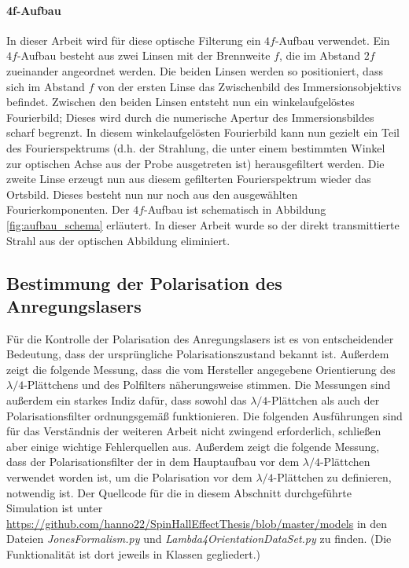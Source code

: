 \documentclass[titlepage,  ngerman]{article}
\begin{document}
	\paragraph{4f-Aufbau}
	In dieser Arbeit wird für diese optische Filterung ein $4f$-Aufbau verwendet. Ein $4f$-Aufbau besteht aus zwei Linsen mit der Brennweite $f$, die im Abstand $2f$ zueinander angeordnet werden. Die beiden Linsen werden so positioniert, dass sich im Abstand $f$ von der ersten Linse das Zwischenbild des Immersionsobjektivs befindet. Zwischen den beiden Linsen entsteht nun ein winkelaufgelöstes Fourierbild; Dieses wird durch die numerische Apertur des Immersionsbildes scharf begrenzt.  In diesem winkelaufgelösten Fourierbild kann nun gezielt ein Teil des Fourierspektrums (d.h. der Strahlung, die unter einem bestimmten Winkel zur optischen Achse aus der Probe ausgetreten ist) herausgefiltert werden. Die zweite Linse erzeugt nun aus diesem gefilterten Fourierspektrum wieder das Ortsbild. Dieses besteht nun nur noch aus den ausgewählten Fourierkomponenten. Der $4f$-Aufbau ist schematisch in Abbildung \ref{fig:aufbau_schema} erläutert. In dieser Arbeit wurde so der direkt transmittierte Strahl aus der optischen Abbildung eliminiert.
	\subsection{Bestimmung der Polarisation des Anregungslasers}
	\label{sec:polarimeter}
	Für die Kontrolle der Polarisation des Anregungslasers ist es von entscheidender Bedeutung, dass der ursprüngliche Polarisationszustand bekannt ist. Außerdem zeigt die folgende Messung, dass die vom Hersteller angegebene Orientierung des $\lambda/4$-Plättchens und des Polfilters näherungsweise stimmen. Die Messungen sind außerdem ein starkes Indiz dafür, dass sowohl das $\lambda/4$-Plättchen als auch der Polarisationsfilter ordnungsgemäß funktionieren. Die folgenden Ausführungen sind für das Verständnis der weiteren Arbeit nicht zwingend erforderlich, schließen aber einige wichtige Fehlerquellen aus. Außerdem zeigt die folgende Messung, dass der Polarisationsfilter der in dem Hauptaufbau vor dem $\lambda / 4$-Plättchen verwendet worden ist, um die Polarisation vor dem $\lambda / 4$-Plättchen zu definieren, notwendig ist. Der Quellcode für die in diesem Abschnitt durchgeführte Simulation ist unter \url{https://github.com/hanno22/SpinHallEffectThesis/blob/master/models} in den Dateien \textit{JonesFormalism.py} und \textit{Lambda4OrientationDataSet.py} zu finden. (Die Funktionalität ist dort jeweils in Klassen gegliedert.)
\end{document}
